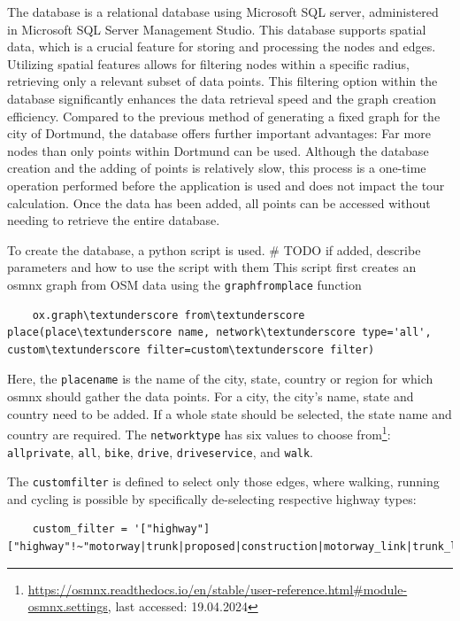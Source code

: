 The database is a relational database using Microsoft SQL server, administered in Microsoft SQL Server Management Studio.
This database supports spatial data, which is a crucial feature for storing and processing the nodes and edges.
Utilizing spatial features allows for filtering nodes within a specific radius, retrieving only a relevant subset of data points.
This filtering option within the database significantly enhances the data retrieval speed and the graph creation efficiency.
Compared to the previous method of generating a fixed graph for the city of Dortmund, the database offers further important advantages:
Far more nodes than only points within Dortmund can be used.
Although the database creation and the adding of points is relatively slow, this process is a one-time operation performed before the application is used and does not impact the tour calculation. 
Once the data has been added, all points can be accessed without needing to retrieve the entire database.

To create the database, a python script is used. \# TODO if added, describe parameters and how to use the script with them
This script first creates an osmnx graph from OSM data using the \texttt{graph\textunderscore from\textunderscore place} function
\begin{lstlisting}
	ox.graph\textunderscore from\textunderscore place(place\textunderscore name, network\textunderscore type='all', custom\textunderscore filter=custom\textunderscore filter)
\end{lstlisting}

Here, the \texttt{place\textunderscore name} is the name of the city, state, country or region for which osmnx should gather the data points.
For a city, the city's name, state and country need to be added. 
If a whole state should be selected, the state name and country are required.
The \texttt{network\textunderscore type} has six values to choose from\footnote{\url{https://osmnx.readthedocs.io/en/stable/user-reference.html\#module-osmnx.settings}, last accessed: 19.04.2024}: \texttt{all\textunderscore private}, \texttt{all}, \texttt{bike}, \texttt{drive}, \texttt{drive\textunderscore service}, and \texttt{walk}. 

The \texttt{custom\textunderscore filter} is defined to select only those edges, where walking, running and cycling is possible by specifically de-selecting respective highway types:

\begin{lstlisting}
	custom_filter = '["highway"]["highway"!~"motorway|trunk|proposed|construction|motorway_link|trunk_link"]'
\end{lstlisting}

